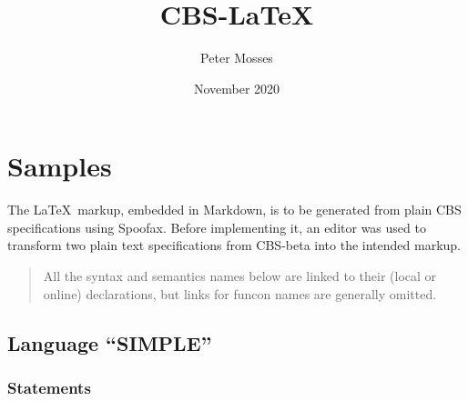 \documentclass[fleqn]{article}
\title{CBS-LaTeX}
\author{Peter Mosses}
\date{November 2020}
\begin{document}
\maketitle

\section*{Samples}

The \LaTeX\ markup, embedded in Markdown, is to be generated from plain CBS specifications using Spoofax.
Before implementing it, an editor was used to transform two plain text specifications from CBS-beta into the intended markup.

\begin{quote}
All the syntax and semantics names below are linked to their (local or online) declarations, but links for funcon names are generally omitted.
\end{quote}

\subsection*{Language ``SIMPLE''}

\subsubsection*{Statements}
\end{document}
